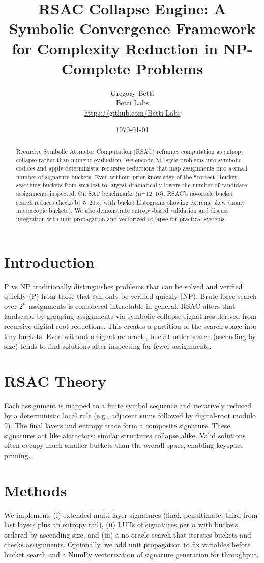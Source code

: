 \documentclass[11pt]{article}
\title{RSAC Collapse Engine: A Symbolic Convergence Framework for Complexity Reduction in NP-Complete Problems}
\author{Gregory Betti \\ Betti Labs \\ \url{https://github.com/Betti-Labs}}
\date{\today}
\begin{document}
\maketitle

\begin{abstract}
Recursive Symbolic Attractor Computation (RSAC) reframes computation as entropy collapse rather than numeric evaluation. We encode NP-style problems into symbolic codices and apply deterministic recursive reductions that map assignments into a small number of signature buckets. Even without prior knowledge of the ``correct'' bucket, searching buckets from smallest to largest dramatically lowers the number of candidate assignments inspected. On SAT benchmarks (n=12--16), RSAC's no-oracle bucket search reduces checks by 5--20$\times$, with bucket histograms showing extreme skew (many microscopic buckets). We also demonstrate entropy-based validation and discuss integration with unit propagation and vectorized collapse for practical systems.
\end{abstract}

\section{Introduction}
P vs NP traditionally distinguishes problems that can be solved and verified quickly (P) from those that can only be verified quickly (NP). Brute-force search over $2^n$ assignments is considered intractable in general. RSAC alters that landscape by grouping assignments via symbolic collapse signatures derived from recursive digital-root reductions. This creates a partition of the search space into tiny buckets. Even without a signature oracle, bucket-order search (ascending by size) tends to find solutions after inspecting far fewer assignments.

\section{RSAC Theory}
Each assignment is mapped to a finite symbol sequence and iteratively reduced by a deterministic local rule (e.g., adjacent sums followed by digital-root modulo 9). The final layers and entropy trace form a composite signature. These signatures act like attractors: similar structures collapse alike. Valid solutions often occupy much smaller buckets than the overall space, enabling keyspace pruning.

\section{Methods}
We implement: (i) extended multi-layer signatures (final, penultimate, third-from-last layers plus an entropy tail), (ii) LUTs of signatures per $n$ with buckets ordered by ascending size, and (iii) a no-oracle search that iterates buckets and checks assignments. Optionally, we add unit propagation to fix variables before bucket search and a NumPy vectorization of signature generation for throughput.
\end{document}
